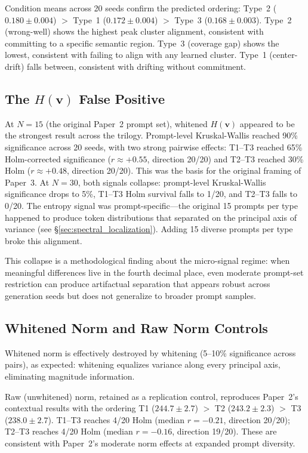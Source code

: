 \documentclass[11pt]{article}
\newcommand{\Hv}{H(\mathbf{v})}
\begin{document}
Condition means across 20 seeds confirm the predicted ordering: Type~2 ($0.180 \pm 0.004$) $>$ Type~1 ($0.172 \pm 0.004$) $>$ Type~3 ($0.168 \pm 0.003$). Type~2 (wrong-well) shows the highest peak cluster alignment, consistent with committing to a specific semantic region. Type~3 (coverage gap) shows the lowest, consistent with failing to align with any learned cluster. Type~1 (center-drift) falls between, consistent with drifting without commitment.

\subsection{The $\Hv$ False Positive}

At $N = 15$ (the original Paper~2 prompt set), whitened $\Hv$ appeared to be the strongest result across the trilogy. Prompt-level Kruskal-Wallis reached 90\% significance across 20 seeds, with two strong pairwise effects: T1--T3 reached 65\% Holm-corrected significance ($r \approx +0.55$, direction 20/20) and T2--T3 reached 30\% Holm ($r \approx +0.48$, direction 20/20). This was the basis for the original framing of Paper~3. At $N = 30$, both signals collapse: prompt-level Kruskal-Wallis significance drops to 5\%, T1--T3 Holm survival falls to 1/20, and T2--T3 falls to 0/20. The entropy signal was prompt-specific---the original 15 prompts per type happened to produce token distributions that separated on the principal axis of variance (see \S\ref{sec:spectral_localization}). Adding 15 diverse prompts per type broke this alignment.

This collapse is a methodological finding about the micro-signal regime: when meaningful differences live in the fourth decimal place, even moderate prompt-set restriction can produce artifactual separation that appears robust across generation seeds but does not generalize to broader prompt samples.

\subsection{Whitened Norm and Raw Norm Controls}

Whitened norm is effectively destroyed by whitening (5--10\% significance across pairs), as expected: whitening equalizes variance along every principal axis, eliminating magnitude information.

Raw (unwhitened) norm, retained as a replication control, reproduces Paper~2's contextual results with the ordering T1 ($244.7 \pm 2.7$) $>$ T2 ($243.2 \pm 2.3$) $>$ T3 ($238.0 \pm 2.7$). T1--T3 reaches 4/20 Holm (median $r = -0.21$, direction 20/20); T2--T3 reaches 4/20 Holm (median $r = -0.16$, direction 19/20). These are consistent with Paper~2's moderate norm effects at expanded prompt diversity.
\end{document}
